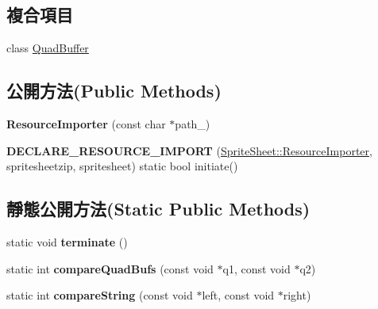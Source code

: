 \subsection*{複合項目}
\begin{DoxyCompactItemize}
\item 
class \hyperlink{class_magnum_1_1_sprite_sheet_1_1_resource_importer_1_1_quad_buffer}{Quad\+Buffer}
\end{DoxyCompactItemize}
\subsection*{公開方法(Public Methods)}
\begin{DoxyCompactItemize}
\item 
{\bfseries Resource\+Importer} (const char $\ast$path\+\_\+)\hypertarget{class_magnum_1_1_sprite_sheet_1_1_resource_importer_a7987ecc77bde3ed0b48386105da75f3e}{}\label{class_magnum_1_1_sprite_sheet_1_1_resource_importer_a7987ecc77bde3ed0b48386105da75f3e}

\item 
{\bfseries D\+E\+C\+L\+A\+R\+E\+\_\+\+R\+E\+S\+O\+U\+R\+C\+E\+\_\+\+I\+M\+P\+O\+RT} (\hyperlink{class_magnum_1_1_sprite_sheet_1_1_resource_importer}{Sprite\+Sheet\+::\+Resource\+Importer}, spritesheetzip, spritesheet) static bool initiate()\hypertarget{class_magnum_1_1_sprite_sheet_1_1_resource_importer_ae640f725032c0f3e123f248bfbd1115d}{}\label{class_magnum_1_1_sprite_sheet_1_1_resource_importer_ae640f725032c0f3e123f248bfbd1115d}

\end{DoxyCompactItemize}
\subsection*{靜態公開方法(Static Public Methods)}
\begin{DoxyCompactItemize}
\item 
static void {\bfseries terminate} ()\hypertarget{class_magnum_1_1_sprite_sheet_1_1_resource_importer_acd527c719532cb1ba6ca805e98d3ea30}{}\label{class_magnum_1_1_sprite_sheet_1_1_resource_importer_acd527c719532cb1ba6ca805e98d3ea30}

\item 
static int {\bfseries compare\+Quad\+Bufs} (const void $\ast$q1, const void $\ast$q2)\hypertarget{class_magnum_1_1_sprite_sheet_1_1_resource_importer_a3656ec343620ea1e1767787556cbc1bb}{}\label{class_magnum_1_1_sprite_sheet_1_1_resource_importer_a3656ec343620ea1e1767787556cbc1bb}

\item 
static int {\bfseries compare\+String} (const void $\ast$left, const void $\ast$right)\hypertarget{class_magnum_1_1_sprite_sheet_1_1_resource_importer_ae8b74e53b3638a0a269401222a536359}{}\label{class_magnum_1_1_sprite_sheet_1_1_resource_importer_ae8b74e53b3638a0a269401222a536359}

\end{DoxyCompactItemize}
